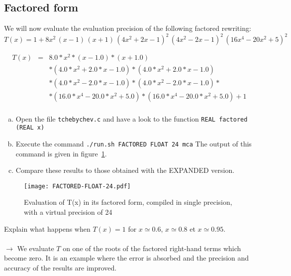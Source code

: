 \subsection{Factored form}

We will now evaluate the evaluation precision of the following factored rewriting:
\[
    T(x) = 1 + 8x^2\,(x-1)\,(x+1)\,(4x^2 + 2x - 1)^2\, (4x^2 - 2x - 1)^2\,(16x^4 - 20x^2 + 5)^2
\]

\begin{eqnarray*}
    T(x) &=& 8.0*x^2*(x - 1.0)*(x + 1.0) \\
    & & * (4.0*x^2 + 2.0*x - 1.0)*(4.0*x^2 + 2.0*x - 1.0) \\
    & & * (4.0*x^2 - 2.0*x - 1.0)*(4.0*x^2 - 2.0*x - 1.0)* \\
    & & * (16.0*x^4 - 20.0*x^2 + 5.0)*(16.0*x^4 - 20.0*x^2 + 5.0) + 1 \\
\end{eqnarray*}

\begin{question}
    \begin{enumerate}[(a)]
        \item Open the file {\tt tchebychev.c} and have a look to the function {\tt REAL factored (REAL x)}
        \item Execute the command {\tt ./run.sh FACTORED FLOAT 24 mca} \newline
              The output of this command is given in figure~\ref{fig:factored:float}.
        \item Compare these results to those obtained with the EXPANDED version.
    \end{enumerate}
\end{question}

\begin{figure}[h]
    \center \texttt{[image: FACTORED-FLOAT-24.pdf]}
    \caption{Evaluation of T(x) in its factored form, compiled in single precision, with a virtual precision of 24}
    \label{fig:factored:float}
\end{figure}

\begin{question}
    Explain what happens when $T(x)=1$ for $x\simeq 0.6$,
    $x\simeq 0.8$ et $x\simeq 0.95$.\\~\\
    $\rightarrow$ We evaluate $T$ on one of the roots of the factored right-hand terms which become zero.
    It is an example where the error is absorbed and the precision and accuracy of the results are improved.
\end{question}


